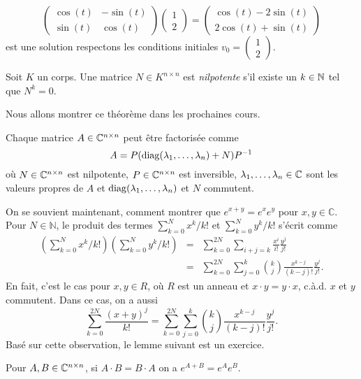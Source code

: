 \begin{example}
\begin{displaymath}
\begin{pmatrix}
    \cos(t)&-\sin(t)\\
    \sin(t)&\cos(t)
  \end{pmatrix} \begin{pmatrix}
    1\\
    2
\end{pmatrix}   =  \begin{pmatrix}
    \cos(t)-2\sin(t)\\
    2\cos(t)+\sin(t)
\end{pmatrix} 
\end{displaymath}
est une solution respectons les conditions initiales  $v_0 = 
\begin{pmatrix}
    1\\
    2
\end{pmatrix} $. 
\end{example}






\begin{definition}
  \label{def:29}Soit $K$ un corps. 
  Une matrice $N ∈ K^{n ×n}$ est \emph{nilpotente} s'il existe un $k \in \mathbb{N}$ tel que $N^k = 0$. 
\end{definition}

Nous allons montrer ce théorème dans les prochaines cours.  
\begin{theorem}
  \label{thr:32}
  Chaque matrice $A \in \mathbb{C}^{n \times n}$ peut être factorisée comme 
  \begin{displaymath}
    A = P ( \operatorname{diag}(\lambda_1,\dots,\lambda_n) + N) P^{-1}
  \end{displaymath}
où $N \in \mathbb{C}^{n \times n}$ est nilpotente, $P \in \mathbb{C}^{n \times n}$ est inversible,  $\lambda_1,\dots,\lambda_n \in \mathbb{C}$ sont les valeurs propres de $A$ et $\operatorname{diag}(\lambda_1,\dots,\lambda_n)$ et $N$ commutent. 
\end{theorem}
%
On se souvient maintenant, comment montrer que $e^{x+y}  = e^xe^y$ pour $x,y∈ ℂ$.  Pour $N ∈ ℕ$, le produit des termes
$∑_{k=0}^N x^k / k! $ et $∑_{k=0}^N y^k / k! $ s'écrit comme 
\begin{eqnarray}
  \left(∑_{k=0}^N x^k / k! \right) \left(∑_{k=0}^N y^k / k! \right) & = & \displaystyle  ∑_{k=0}^{2N}  ∑_{i+j = k} \frac{x^i}{  i!} \frac{y^j}{ j!} \\
  & = &  \displaystyle ∑_{k=0}^{2N}  ∑_{j = 0}^k \binom{k}{j} \frac{x^{k-j} }{(k-j)!} \frac{y^{j} }{j!}.   
\end{eqnarray}
En fait, c'est le cas pour $x,y ∈ R$, où $R$ est un anneau et $x ⋅ y  = y ⋅x$, c.à.d. $x$ et $y$ commutent.  Dans ce cas, on a aussi
\begin{displaymath}
  \displaystyle  ∑_{k=0}^{2N} \frac{(x+y)^j}{k!} =  \displaystyle  ∑_{k=0}^{2N}  ∑_{j = 0}^k \binom{k}{j} \frac{x^{k-j} }{(k-j)!} \frac{y^{j} }{j!}.   
\end{displaymath}
%
Basé sur cette observation, le lemme suivant est un exercice. 
\begin{lemma}
  \label{lem:18}
  Pour $A,B \in \mathbb{C}^{n \times n}$, si $A\cdot B = B \cdot A$ on a $e^{A+B} = e^A e^B$. 
\end{lemma}



